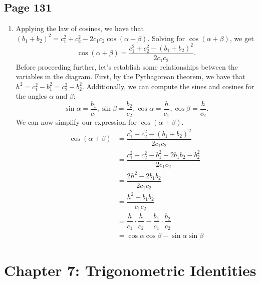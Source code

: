 \documentclass{article}
\newenvironment{solutions}[1]
{\subsection*{#1}
 \begin{enumerate}[leftmargin=1.5em]}
{\end{enumerate}}
\newcommand{\solution}{\item}
\begin{document}
\begin{solutions}{Page 131}
\solution %
Applying the law of cosines, we have that $\left(b_{1} + b_{2}\right)^2 = c_{1}^2 + c_{2}^2 - 2c_1c_2\cos\left(\alpha+\beta\right)$. Solving for $\cos\left(\alpha+\beta\right)$, we get
\[
\cos\left(\alpha+\beta\right) = \dfrac{c_{1}^2 + c_{2}^2 - \left(b_{1}+b_{2}\right)^2}{2c_{1}c_{2}}.
\]
Before proceeding further, let's establish some relationships between the variables in the diagram. First, by the Pythagorean theorem, we have that $h^2 = c_{1}^2 - b_{1}^2 = c_{2}^2 - b_{2}^2$. Additionally, we can compute the sines and cosines for the angles $\alpha$ and $\beta$:
\[
\sin{\alpha} = \dfrac{b_{1}}{c_{1}}, \sin{\beta} = \dfrac{b_{2}}{c_{2}}, \cos{\alpha} = \dfrac{h}{c_{1}}, \cos{\beta} = \dfrac{h}{c_{2}}.
\]
We can now simplify our expression for $\cos\left(\alpha+\beta\right)$.
\begin{align*}
\cos\left(\alpha+\beta\right) &= \dfrac{c_{1}^2 + c_{2}^2 - \left(b_{1}+b_{2}\right)^2}{2c_{1}c_{2}} \\
&= \dfrac{c_{1}^2 + c_{2}^2 - b_{1}^2 - 2b_{1}b_{2} - b_{2}^2}{2c_{1}c_{2}} \\
&= \dfrac{2h^2 - 2b_{1}b_{2}}{2c_{1}c_{2}} \\
&= \dfrac{h^2 - b_{1}b_{2}}{c_{1}c_{2}} \\
&= \dfrac{h}{c_{1}} \cdot \dfrac{h}{c_{2}} - \dfrac{b_{1}}{c_{1}} \cdot \dfrac{b_{2}}{c_{2}} \\
&= \cos{\alpha}\cos{\beta} - \sin{\alpha}\sin{\beta}
\end{align*}
\end{solutions}


\section*{Chapter 7: Trigonometric Identities}
\end{document}
